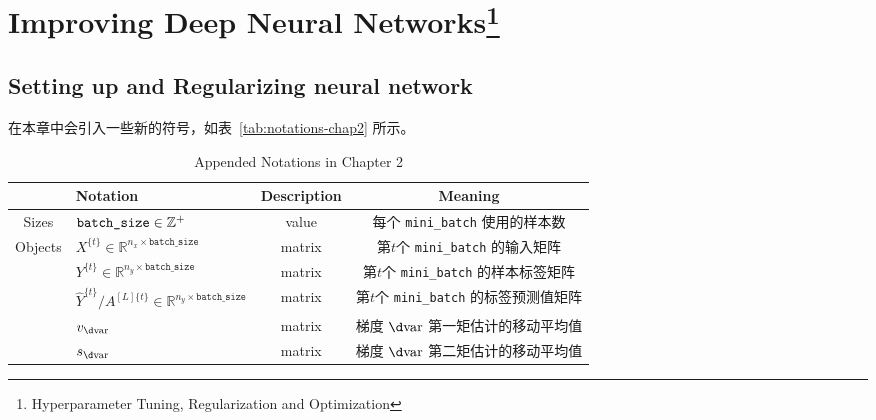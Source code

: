 \chapter[Improving Deep Neural Networks]{Improving Deep Neural Networks\setcounter{footnote}{0}\footnote{Hyperparameter Tuning, Regularization and Optimization}}

\section{Setting up and Regularizing neural network}

在本章中会引入一些新的符号，如表~\ref{tab:notations-chap2} 所示。

\begin{table}[htb!]
    \centering
    \begin{threeparttable}
    \caption{Appended Notations in Chapter 2}
    \begin{tabular}{clcc}
        \toprule
                                    & \textbf{Notation}                                                                     & \textbf{Description} & \textbf{Meaning}                                                   \\ 
        \midrule
        \multirow{1}{*}{Sizes}      & $\verb|batch_size| \in \mathbb{Z}^+$								                    & value                & 每个 \verb|mini_batch| 使用的样本数                                  \\
        \midrule
        \multirow{5}{*}{Objects}    & $X^{\{t\}} \in \mathbb{R}^{n_x \times \mathtt{batch\_size}}$                          & matrix               & 第$t$个 \verb|mini_batch| 的输入矩阵                                 \\
                                    & $Y^{\{t\}} \in {\mathbb{R}^{n_y \times \mathtt{batch\_size}}}$                        & matrix               & 第$t$个 \verb|mini_batch| 的样本标签矩阵                              \\									
                                    & $\hat{Y}^{\{t\}} / A^{[L]\{t\}} \in {\mathbb{R}^{n_y \times \mathtt{batch\_size}}}$   & matrix               & 第$t$个 \verb|mini_batch| 的标签预测值矩阵   						   \\
                                    & $v_{\d \mathrm{var}}$                                                                 & matrix               & 梯度 $\d \mathrm{var}$ 第一矩估计的移动平均值                          \\
                                    & $s_{\d \mathrm{var}}$                                                                 & matrix               & 梯度 $\d \mathrm{var}$ 第二矩估计的移动平均值                         \\

\end{tabular}
\end{threeparttable}
\end{table}

